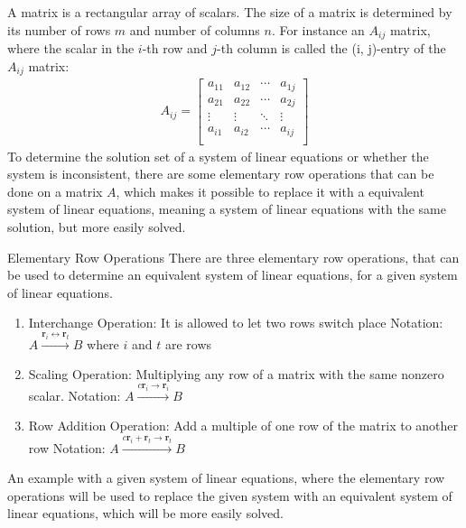 A matrix is a rectangular array of scalars. The size of a matrix is determined by its number of rows $m$ and number of columns $n$. 
For instance an $A_{ij}$ matrix, where the scalar in the $i$-th row and $j$-th column is called the (i, j)-entry of the $A_{ij}$ matrix:
\begin{align*}
    A_{ij} = 
    \begin{bmatrix}
    a_{1 1} & a_{1 2} & \cdots & a_{1 j}\\
    a_{2 1} & a_{2 2} & \cdots & a_{2 j}\\
    \vdots  &   \vdots &  \ddots   & \vdots \\
    a_{i 1} & a_{i 2} & \cdots & a_{i j}\\
    \end{bmatrix}
\end{align*}
\cite[4]{LiAl}
To determine the solution set of a system of linear equations or whether the system is inconsistent, there are some elementary row operations that can be done on a matrix $A$, which makes it possible to replace it with a equivalent system of linear equations, meaning a system of linear equations with the same solution, but more easily solved.
\begin{definition}{Elementary Row Operations}
There are three elementary row operations, that can be used to determine an equivalent system of linear equations, for a given system of linear equations.
\begin{enumerate}
    \item Interchange Operation:
    It is allowed to let two rows switch place 
    Notation: $A\xrightarrow{\textbf{r}_i\leftrightarrow \textbf{r}_t} B$ where $i$ and $t$ are rows
    \item Scaling Operation:
    Multiplying any row of a matrix with the same nonzero scalar.
    Notation: $A\xrightarrow{c\textbf{r}_i\rightarrow \textbf{r}_i} B$
    \item Row Addition Operation:
    Add a multiple of one row of the matrix to another row
    Notation: $A\xrightarrow{c\textbf{r}_i+\textbf{r}_t\rightarrow \textbf{r}_t} B$
\end{enumerate}
\cite[32]{LiAl}
\end {definition}
An example with a given system of linear equations, where the  elementary row operations will be used to replace the given system with an equivalent system of linear equations, which will be more easily solved.
